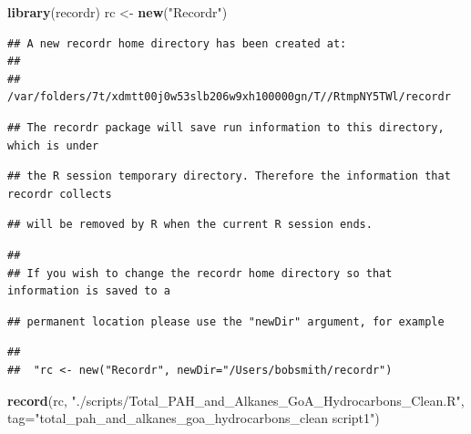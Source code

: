 \documentclass[]{article}
\newenvironment{Shaded}{\begin{snugshade}}{\end{snugshade}}
\newcommand{\DataTypeTok}[1]{\textcolor[rgb]{0.13,0.29,0.53}{#1}}
\newcommand{\KeywordTok}[1]{\textcolor[rgb]{0.13,0.29,0.53}{\textbf{#1}}}
\newcommand{\NormalTok}[1]{#1}
\newcommand{\StringTok}[1]{\textcolor[rgb]{0.31,0.60,0.02}{#1}}
\begin{document}
\begin{Shaded}
\begin{Highlighting}[]
\KeywordTok{library}\NormalTok{(recordr)}
\NormalTok{rc <-}\StringTok{ }\KeywordTok{new}\NormalTok{(}\StringTok{"Recordr"}\NormalTok{)}
\end{Highlighting}
\end{Shaded}

\begin{verbatim}
## A new recordr home directory has been created at:
## 
##  /var/folders/7t/xdmtt00j0w53slb206w9xh100000gn/T//RtmpNY5TWl/recordr
\end{verbatim}

\begin{verbatim}
## The recordr package will save run information to this directory, which is under
\end{verbatim}

\begin{verbatim}
## the R session temporary directory. Therefore the information that recordr collects
\end{verbatim}

\begin{verbatim}
## will be removed by R when the current R session ends.
\end{verbatim}

\begin{verbatim}
## 
## If you wish to change the recordr home directory so that information is saved to a
\end{verbatim}

\begin{verbatim}
## permanent location please use the "newDir" argument, for example
\end{verbatim}

\begin{verbatim}
## 
##  "rc <- new("Recordr", newDir="/Users/bobsmith/recordr")
\end{verbatim}

\begin{Shaded}
\begin{Highlighting}[]
\KeywordTok{record}\NormalTok{(rc, }\StringTok{"./scripts/Total_PAH_and_Alkanes_GoA_Hydrocarbons_Clean.R"}\NormalTok{, }\DataTypeTok{tag=}\StringTok{"total_pah_and_alkanes_goa_hydrocarbons_clean script1"}\NormalTok{)}
\end{Highlighting}
\end{Shaded}
\end{document}
